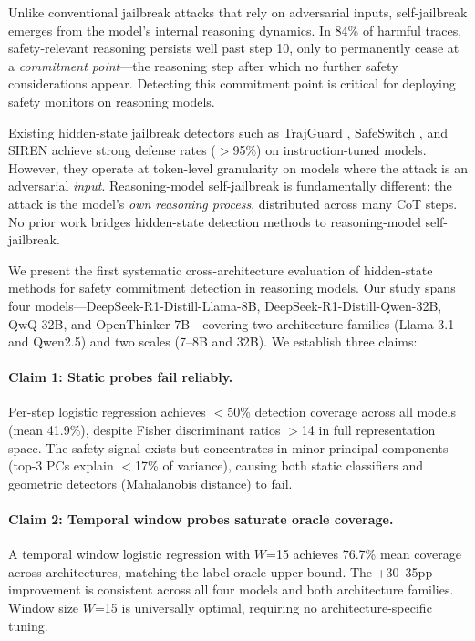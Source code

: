 \documentclass[11pt,a4paper]{article}
\begin{document}
Unlike conventional jailbreak attacks that rely on adversarial inputs, self-jailbreak emerges from the model's internal reasoning dynamics.
In 84\% of harmful traces, safety-relevant reasoning persists well past step 10, only to permanently cease at a \emph{commitment point}---the reasoning step after which no further safety considerations appear.
Detecting this commitment point is critical for deploying safety monitors on reasoning models.

Existing hidden-state jailbreak detectors such as TrajGuard \cite{trajguard}, SafeSwitch \cite{safeswitch}, and SIREN \cite{siren} achieve strong defense rates ($>$95\%) on instruction-tuned models.
However, they operate at token-level granularity on models where the attack is an adversarial \emph{input}.
Reasoning-model self-jailbreak is fundamentally different: the attack is the model's \emph{own reasoning process}, distributed across many CoT steps.
No prior work bridges hidden-state detection methods to reasoning-model self-jailbreak.

We present the first systematic cross-architecture evaluation of hidden-state methods for safety commitment detection in reasoning models.
Our study spans four models---DeepSeek-R1-Distill-Llama-8B, DeepSeek-R1-Distill-Qwen-32B, QwQ-32B, and OpenThinker-7B---covering two architecture families (Llama-3.1 and Qwen2.5) and two scales (7--8B and 32B).
We establish three claims:

\paragraph{Claim 1: Static probes fail reliably.} Per-step logistic regression achieves $<$50\% detection coverage across all models (mean 41.9\%), despite Fisher discriminant ratios $>$14 in full representation space.  The safety signal exists but concentrates in minor principal components (top-3 PCs explain $<$17\% of variance), causing both static classifiers and geometric detectors (Mahalanobis distance) to fail.

\paragraph{Claim 2: Temporal window probes saturate oracle coverage.} A temporal window logistic regression with $W$=15 achieves 76.7\% mean coverage across architectures, matching the label-oracle upper bound.  The +30--35pp improvement is consistent across all four models and both architecture families.  Window size $W$=15 is universally optimal, requiring no architecture-specific tuning.
\end{document}
